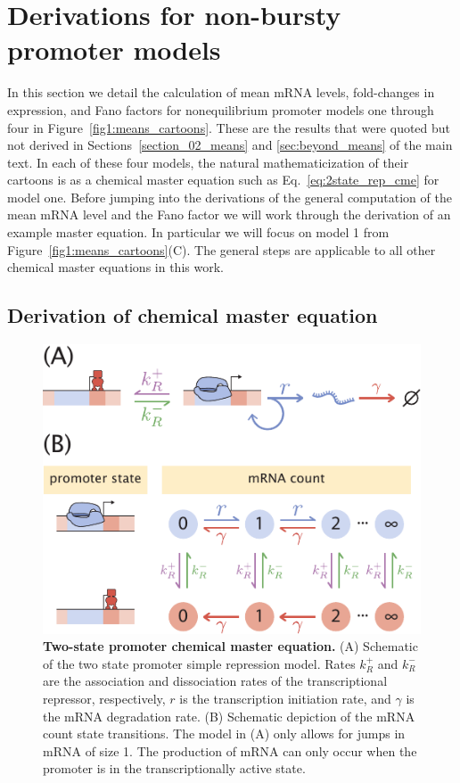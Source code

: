 \section{Derivations for non-bursty promoter models}
\label{sec:non_bursty}

In this section we detail the calculation of mean mRNA levels, fold-changes in
expression, and Fano factors for nonequilibrium promoter models one through four
in Figure~\ref{fig1:means_cartoons}. These are the results that were quoted but
not derived in Sections~\ref{section_02_means} and \ref{sec:beyond_means} of the
main text. In each of these four models, the natural mathematicization of their
cartoons is as a chemical master equation such as Eq.~\ref{eq:2state_rep_cme}
for model one. Before jumping into the derivations of the general computation of
the mean mRNA level and the Fano factor we will work through the derivation of an example master equation. In particular we will focus on model 1 from 
Figure~\ref{fig1:means_cartoons}(C). The general steps are applicable to all
other chemical master equations in this work.

\subsection{Derivation of chemical master equation}

\begin{figure}[h!]
\centering
\includegraphics{../figures/si/figS0X_two_state.pdf}
\caption{
\textbf{Two-state promoter chemical master equation.}
(A) Schematic of the two state promoter simple repression model. Rates $k_R^+$
and $k_R^-$ are the association and dissociation rates of the transcriptional
repressor, respectively, $r$ is the transcription initiation rate, and $\gamma$
is the mRNA degradation rate. (B) Schematic depiction of the mRNA count state
transitions. The model in (A) only allows for jumps in mRNA of size 1. The
production of mRNA can only occur when the promoter is in the transcriptionally
active state.}
\label{fig:two_state}
\end{figure}

